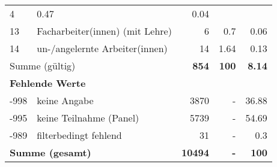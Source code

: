 \begin{longtable}{lXrrr}
       \num{4} &
       \num[round-mode=places,round-precision=2]{0.47} &
         \num[round-mode=places,round-precision=2]{0.04} \\

     13 &
     \multicolumn{1}{X}{ Facharbeiter(innen) (mit Lehre)   } &


       \num{6} &
       \num[round-mode=places,round-precision=2]{0.7} &
         \num[round-mode=places,round-precision=2]{0.06} \\

     14 &
     \multicolumn{1}{X}{ un-/angelernte Arbeiter(innen)   } &


       \num{14} &
       \num[round-mode=places,round-precision=2]{1.64} &
         \num[round-mode=places,round-precision=2]{0.13} \\
     \midrule
     \multicolumn{2}{l}{Summe (gültig)} &
       \textbf{\num{854}} &
     \textbf{\num{100}} &
       \textbf{\num[round-mode=places,round-precision=2]{8.14}} \\
     \multicolumn{5}{l}{\textbf{Fehlende Werte}}\\
       -998 &
       keine Angabe &
         \num{3870} &
        - &
         \num[round-mode=places,round-precision=2]{36.88} \\
       -995 &
       keine Teilnahme (Panel) &
         \num{5739} &
        - &
         \num[round-mode=places,round-precision=2]{54.69} \\
       -989 &
       filterbedingt fehlend &
         \num{31} &
        - &
         \num[round-mode=places,round-precision=2]{0.3} \\
     \midrule
     \multicolumn{2}{l}{\textbf{Summe (gesamt)}} &
          \textbf{\num{10494}} &
        \textbf{-} &
        \textbf{\num{100}} \\
     \bottomrule
     \end{longtable}
     
